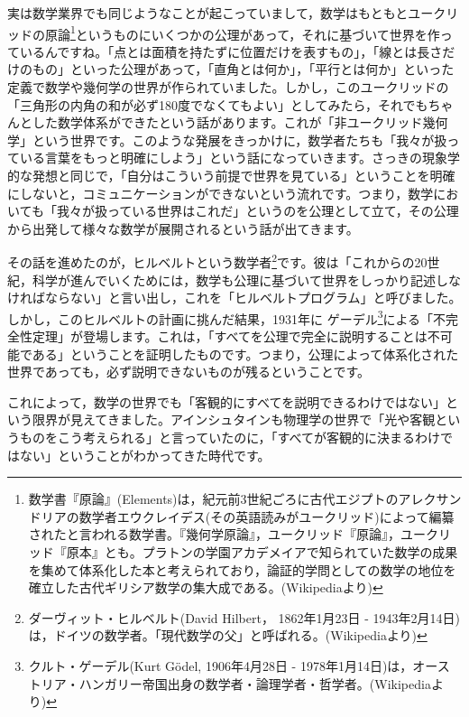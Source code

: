 \documentclass{ltjsbook}
\begin{document}
実は数学業界でも同じようなことが起こっていまして，数学はもともとユークリッドの原論\footnote{数学書『原論』(Elements)は，紀元前3世紀ごろに古代エジプトのアレクサンドリアの数学者エウクレイデス(その英語読みがユークリッド)によって編纂されたと言われる数学書。『幾何学原論』，ユークリッド『原論』，ユークリッド『原本』とも。プラトンの学園アカデメイアで知られていた数学の成果を集めて体系化した本と考えられており，論証的学問としての数学の地位を確立した古代ギリシア数学の集大成である。(Wikipediaより)}というものにいくつかの公理があって，それに基づいて世界を作っているんですね。「点とは面積を持たずに位置だけを表すもの」，「線とは長さだけのもの」といった公理があって，「直角とは何か」，「平行とは何か」といった定義で数学や幾何学の世界が作られていました。しかし，このユークリッドの「三角形の内角の和が必ず180度でなくてもよい」としてみたら，それでもちゃんとした数学体系ができたという話があります。これが「非ユークリッド幾何学」という世界です。このような発展をきっかけに，数学者たちも「我々が扱っている言葉をもっと明確にしよう」という話になっていきます。さっきの現象学的な発想と同じで，「自分はこういう前提で世界を見ている」ということを明確にしないと，コミュニケーションができないという流れです。つまり，数学においても「我々が扱っている世界はこれだ」というのを公理として立て，その公理から出発して様々な数学が展開されるという話が出てきます。

その話を進めたのが，ヒルベルトという数学者\footnote{ダーヴィット・ヒルベルト(David Hilbert， 1862年1月23日 - 1943年2月14日)は，ドイツの数学者。「現代数学の父」と呼ばれる。(Wikipediaより)}です。彼は「これからの20世紀，科学が進んでいくためには，数学も公理に基づいて世界をしっかり記述しなければならない」と言い出し，これを「ヒルベルトプログラム」と呼びました。しかし，このヒルベルトの計画に挑んだ結果，1931年に ゲーデル\footnote{クルト・ゲーデル(Kurt Gödel, 1906年4月28日 - 1978年1月14日)は，オーストリア・ハンガリー帝国出身の数学者・論理学者・哲学者。(Wikipediaより)}による「不完全性定理」が登場します。これは，「すべてを公理で完全に説明することは不可能である」ということを証明したものです。つまり，公理によって体系化された世界であっても，必ず説明できないものが残るということです。

これによって，数学の世界でも「客観的にすべてを説明できるわけではない」という限界が見えてきました。アインシュタインも物理学の世界で「光や客観というものをこう考えられる」と言っていたのに，「すべてが客観的に決まるわけではない」ということがわかってきた時代です。
\end{document}
